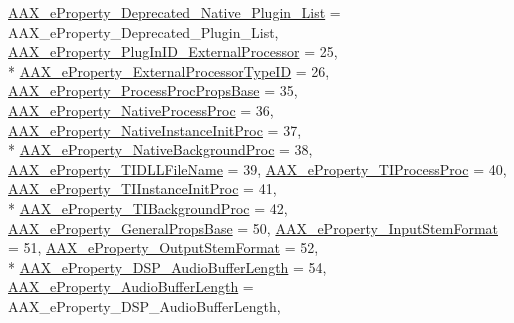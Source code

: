 \begin{DoxyCompactItemize}
\hyperlink{a00283_a6571f4e41a5dd06e4067249228e2249ea3f1e690c987d601001a7cc1da8247399}{A\+A\+X\+\_\+e\+Property\+\_\+\+Deprecated\+\_\+\+Native\+\_\+\+Plugin\+\_\+\+List} = A\+A\+X\+\_\+e\+Property\+\_\+\+Deprecated\+\_\+\+Plugin\+\_\+\+List, 
\hyperlink{a00283_a6571f4e41a5dd06e4067249228e2249ea2816852168f862575c687d28b48d0581}{A\+A\+X\+\_\+e\+Property\+\_\+\+Plug\+In\+I\+D\+\_\+\+External\+Processor} = 25, 
\\*
\hyperlink{a00283_a6571f4e41a5dd06e4067249228e2249eae51207358c4c8a00e6c5e26650ebeef2}{A\+A\+X\+\_\+e\+Property\+\_\+\+External\+Processor\+Type\+I\+D} = 26, 
\hyperlink{a00283_a6571f4e41a5dd06e4067249228e2249ea9a78445174f219014332c67af3b1eda6}{A\+A\+X\+\_\+e\+Property\+\_\+\+Process\+Proc\+Props\+Base} = 35, 
\hyperlink{a00283_a6571f4e41a5dd06e4067249228e2249ea43e55994526d4623cab23fc3200d3762}{A\+A\+X\+\_\+e\+Property\+\_\+\+Native\+Process\+Proc} = 36, 
\hyperlink{a00283_a6571f4e41a5dd06e4067249228e2249ea0f182ea271ec0aa1a49dd9c995826ef5}{A\+A\+X\+\_\+e\+Property\+\_\+\+Native\+Instance\+Init\+Proc} = 37, 
\\*
\hyperlink{a00283_a6571f4e41a5dd06e4067249228e2249eaee9d07e634f3f31988e0bbcfa33a6222}{A\+A\+X\+\_\+e\+Property\+\_\+\+Native\+Background\+Proc} = 38, 
\hyperlink{a00283_a6571f4e41a5dd06e4067249228e2249eaa38d1dee38945c7b0f5333b6cec02819}{A\+A\+X\+\_\+e\+Property\+\_\+\+T\+I\+D\+L\+L\+File\+Name} = 39, 
\hyperlink{a00283_a6571f4e41a5dd06e4067249228e2249ea1c4750cff6cd0dc467287edfb88ed495}{A\+A\+X\+\_\+e\+Property\+\_\+\+T\+I\+Process\+Proc} = 40, 
\hyperlink{a00283_a6571f4e41a5dd06e4067249228e2249eace404ac7f105c8bca24cf14e26479265}{A\+A\+X\+\_\+e\+Property\+\_\+\+T\+I\+Instance\+Init\+Proc} = 41, 
\\*
\hyperlink{a00283_a6571f4e41a5dd06e4067249228e2249eafcf70d8ff9b7a5853ce6248b8deeaeef}{A\+A\+X\+\_\+e\+Property\+\_\+\+T\+I\+Background\+Proc} = 42, 
\hyperlink{a00283_a6571f4e41a5dd06e4067249228e2249ea363690ab5ed1b5ee3666eda48e2b2500}{A\+A\+X\+\_\+e\+Property\+\_\+\+General\+Props\+Base} = 50, 
\hyperlink{a00283_a6571f4e41a5dd06e4067249228e2249eadebf03028b758123965a8b988fa2df99}{A\+A\+X\+\_\+e\+Property\+\_\+\+Input\+Stem\+Format} = 51, 
\hyperlink{a00283_a6571f4e41a5dd06e4067249228e2249ea211fdc6277e7fa652b5d482e810b0bc9}{A\+A\+X\+\_\+e\+Property\+\_\+\+Output\+Stem\+Format} = 52, 
\\*
\hyperlink{a00283_a6571f4e41a5dd06e4067249228e2249ea09fbd1cbcae0e86ad81005258dc1b67e}{A\+A\+X\+\_\+e\+Property\+\_\+\+D\+S\+P\+\_\+\+Audio\+Buffer\+Length} = 54, 
\hyperlink{a00283_a6571f4e41a5dd06e4067249228e2249ea34b1ae8c8edd3080aee6cd677bed9611}{A\+A\+X\+\_\+e\+Property\+\_\+\+Audio\+Buffer\+Length} = A\+A\+X\+\_\+e\+Property\+\_\+\+D\+S\+P\+\_\+\+Audio\+Buffer\+Length, 

\end{DoxyCompactItemize}
